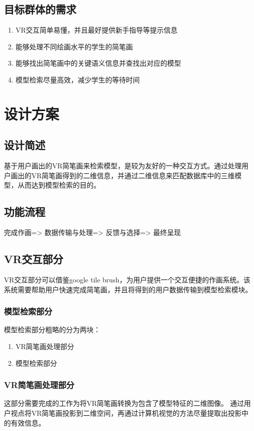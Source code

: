 \documentclass{article}
\begin{document}
\subsection{目标群体的需求}
\begin{enumerate}
    \item VR交互简单易懂，并且最好提供新手指导等提示信息
    \item 能够处理不同绘画水平的学生的简笔画
    \item 能够找出简笔画中的关键语义信息并查找出对应的模型
    \item 模型检索尽量高效，减少学生的等待时间
\end{enumerate}

\section{设计方案}
\subsection{设计简述}
基于用户画出的VR简笔画来检索模型，是较为友好的一种交互方式。通过处理用户画出的VR简笔画得到的二维信息，并通过二维信息来匹配数据库中的三维模型，从而达到模型检索的目的。

\subsection{功能流程}
完成作画=>
数据传输与处理=>
反馈与选择=>
最终呈现

\subsection{VR交互部分}
VR交互部分可以借鉴google tile brush，为用户提供一个交互便捷的作画系统。该系统需要帮助用户快速完成简笔画，并且将得到的用户数据传输到模型检索模块。

\subsubsection{模型检索部分}
模型检索部分粗略的分为两块：
\begin{enumerate}
    \item VR简笔画处理部分
    \item 模型检索部分
\end{enumerate}

\subsubsection{VR简笔画处理部分}
这部分需要完成的工作为将VR简笔画转换为包含了模型特征的二维图像。 
通过用户视点将VR简笔画投影到二维空间，再通过计算机视觉的方法尽量提取出投影中的有效信息。
\end{document}

